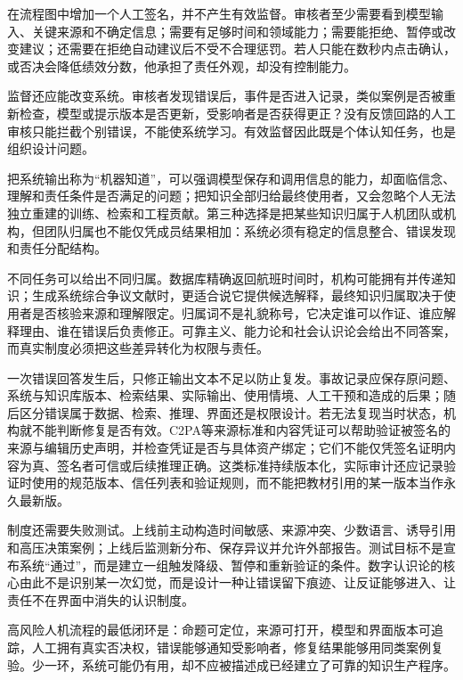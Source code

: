 在流程图中增加一个人工签名，并不产生有效监督。审核者至少需要看到模型输入、关键来源和不确定信息；需要有足够时间和领域能力；需要能拒绝、暂停或改变建议；还需要在拒绝自动建议后不受不合理惩罚。若人只能在数秒内点击确认，或否决会降低绩效分数，他承担了责任外观，却没有控制能力。

监督还应能改变系统。审核者发现错误后，事件是否进入记录，类似案例是否被重新检查，模型或提示版本是否更新，受影响者是否获得更正？没有反馈回路的人工审核只能拦截个别错误，不能使系统学习。有效监督因此既是个体认知任务，也是组织设计问题。

把系统输出称为“机器知道”，可以强调模型保存和调用信息的能力，却面临信念、理解和责任条件是否满足的问题；把知识全部归给最终使用者，又会忽略个人无法独立重建的训练、检索和工程贡献。第三种选择是把某些知识归属于人机团队或机构，但团队归属也不能仅凭成员结果相加：系统必须有稳定的信息整合、错误发现和责任分配结构。

不同任务可以给出不同归属。数据库精确返回航班时间时，机构可能拥有并传递知识；生成系统综合争议文献时，更适合说它提供候选解释，最终知识归属取决于使用者是否核验来源和理解限定。归属词不是礼貌称号，它决定谁可以作证、谁应解释理由、谁在错误后负责修正。可靠主义、能力论和社会认识论会给出不同答案，而真实制度必须把这些差异转化为权限与责任。

一次错误回答发生后，只修正输出文本不足以防止复发。事故记录应保存原问题、系统与知识库版本、检索结果、实际输出、使用情境、人工干预和造成的后果；随后区分错误属于数据、检索、推理、界面还是权限设计。若无法复现当时状态，机构就不能判断修复是否有效。C2PA等来源标准和内容凭证可以帮助验证被签名的来源与编辑历史声明，并检查凭证是否与具体资产绑定；它们不能仅凭签名证明内容为真、签名者可信或后续推理正确\parencite{c2pa2025}。这类标准持续版本化，实际审计还应记录验证时使用的规范版本、信任列表和验证规则，而不能把教材引用的某一版本当作永久最新版。

制度还需要失败测试。上线前主动构造时间敏感、来源冲突、少数语言、诱导引用和高压决策案例；上线后监测新分布、保存异议并允许外部报告。测试目标不是宣布系统“通过”，而是建立一组触发降级、暂停和重新验证的条件。数字认识论的核心由此不是识别某一次幻觉，而是设计一种让错误留下痕迹、让反证能够进入、让责任不在界面中消失的认识制度。

\begin{argumentbox}
高风险人机流程的最低闭环是：命题可定位，来源可打开，模型和界面版本可追踪，人工拥有真实否决权，错误能够通知受影响者，修复结果能够用同类案例复验。少一环，系统可能仍有用，却不应被描述成已经建立了可靠的知识生产程序。
\end{argumentbox}

